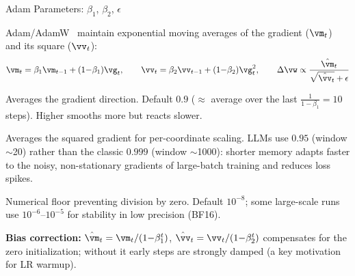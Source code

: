 \begin{frame}{Adam Parameters: $\beta_1$, $\beta_2$, $\epsilon$}

  Adam/AdamW~\cite{kingma2015adam} maintain exponential moving averages of the gradient ($\vm_t$) and its square ($\vv_t$):
  \[
    \vm_t = \beta_1 \vm_{t-1} + (1{-}\beta_1)\vg_t, \qquad
    \vv_t = \beta_2 \vv_{t-1} + (1{-}\beta_2)\vg_t^2, \qquad
    \Delta\vw \propto \frac{\hat{\vm}_t}{\sqrt{\hat{\vv}_t}+\epsilon}
  \]

  \vspace{0.2em}
  \begin{description}[labelwidth=\widthof{\bfseries $\beta_2$ (2nd mom.)~~}, leftmargin=!]
    \item[$\beta_1$ (momentum)] Averages the gradient direction. Default $0.9$ ($\approx$ average over the last $\tfrac{1}{1-\beta_1}{=}10$ steps). Higher smooths more but reacts slower.
    \item[$\beta_2$ (2nd mom.)] Averages the squared gradient for per-coordinate scaling. LLMs use $0.95$ (window $\sim$20) rather than the classic $0.999$ (window $\sim$1000): shorter memory adapts faster to the noisy, non-stationary gradients of large-batch training and reduces loss spikes.
    \item[$\epsilon$] Numerical floor preventing division by zero. Default $10^{-8}$; some large-scale runs use $10^{-6}$--$10^{-5}$ for stability in low precision (BF16).
  \end{description}

  \vspace{0.2em}
  \textbf{Bias correction:} $\hat{\vm}_t = \vm_t/(1{-}\beta_1^t)$, $\hat{\vv}_t = \vv_t/(1{-}\beta_2^t)$ compensates for the zero initialization; without it early steps are strongly damped (a key motivation for LR warmup).
\end{frame}

